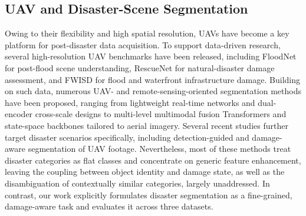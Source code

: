 \documentclass[lettersize,journal]{IEEEtran}
\begin{document}
\subsection{UAV and Disaster-Scene Segmentation}
Owing to their flexibility and high spatial resolution, UAVs have become a key platform for post-disaster data acquisition\cite{liuClusterformerPineTree2024,shaheenSwinSegFormerAdvancingAerial2025}.
To support data-driven research, several high-resolution UAV benchmarks have been released, including FloodNet for post-flood scene understanding, RescueNet for natural-disaster damage assessment, and FWISD for flood and waterfront infrastructure damage\cite{rahnemoonfarFloodnetHighResolution2021, rahnemoonfarRescueNetHighResolution2023, xueFWISDFloodWaterfront2026}. 
Building on such data, numerous UAV- and remote-sensing-oriented segmentation methods have been proposed, ranging from lightweight real-time networks and dual-encoder cross-scale designs to multi-level multimodal fusion Transformers and state-space backbones tailored to aerial imagery\cite{wangUAVSegDualEncoderCrossScale2025,maMultilevelMultimodalFusion2024,huangMambaUAVSegNetMultiscaleAdaptive2024,shaheenSwinSegFormerAdvancingAerial2025,chenRSMambaRemoteSensing2024,felirenProgressiveCrossAttention2025}.
Several recent studies further target disaster scenarios specifically, including detection-guided and damage-aware segmentation of UAV footage\cite{piDetectionSemanticSegmentation2021,zetoutCSDNetContextAwareSegmentation2025,zhuDASegFormerDamageAwareSemantic2026}.
Nevertheless, most of these methods treat disaster categories as flat classes and concentrate on generic feature enhancement, leaving the coupling between object identity and damage state, as well as the disambiguation of contextually similar categories, largely unaddressed. In contrast, our work explicitly formulates disaster segmentation as a fine-grained, damage-aware task and evaluates it across three datasets.
\end{document}
